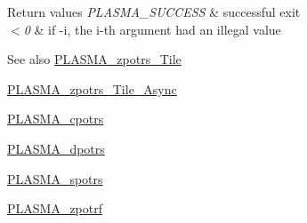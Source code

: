 \begin{DoxyRetVals}{Return values}
{\em P\+L\+A\+S\+M\+A\+\_\+\+S\+U\+C\+C\+E\+S\+S} & successful exit \\
\hline
{\em $<$0} & if -\/i, the i-\/th argument had an illegal value\\
\hline
\end{DoxyRetVals}
\begin{DoxySeeAlso}{See also}
\hyperlink{group__PLASMA__Complex64__t__Tile_gad13147593a1970092f560e8cb54925b8_gad13147593a1970092f560e8cb54925b8}{P\+L\+A\+S\+M\+A\+\_\+zpotrs\+\_\+\+Tile} 

\hyperlink{group__PLASMA__Complex64__t__Tile__Async_ga493aec60380a3935c89f40c976fbb705_ga493aec60380a3935c89f40c976fbb705}{P\+L\+A\+S\+M\+A\+\_\+zpotrs\+\_\+\+Tile\+\_\+\+Async} 

\hyperlink{group__PLASMA__Complex32__t_gaf429b7116507625912226d3c91bdfecc_gaf429b7116507625912226d3c91bdfecc}{P\+L\+A\+S\+M\+A\+\_\+cpotrs} 

\hyperlink{group__double_ga2d3c0509f11f1e9a9cf06b95109e62f5_ga2d3c0509f11f1e9a9cf06b95109e62f5}{P\+L\+A\+S\+M\+A\+\_\+dpotrs} 

\hyperlink{group__float_gab813bd6d81c21feae7ce6553c9ba255a_gab813bd6d81c21feae7ce6553c9ba255a}{P\+L\+A\+S\+M\+A\+\_\+spotrs} 

\hyperlink{group__PLASMA__Complex64__t_ga850a6c9da7c5632d160b28f211cdf2eb_ga850a6c9da7c5632d160b28f211cdf2eb}{P\+L\+A\+S\+M\+A\+\_\+zpotrf} 
\end{DoxySeeAlso}
\hypertarget{group__PLASMA__Complex64__t_ga78d0974b51b7d019e0606422b3292b46_ga78d0974b51b7d019e0606422b3292b46}{}
